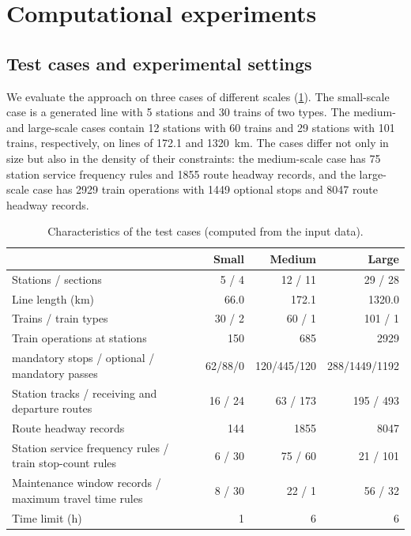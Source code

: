 \section{Computational experiments}\label{sec:exp}
\subsection{Test cases and experimental settings}\label{sec:cases}
We evaluate the approach on three cases of different scales (\cref{tab:cases}). The small-scale case is a generated line with 5 stations and 30 trains of two types. The medium- and large-scale cases contain 12 stations with 60 trains and 29 stations with 101 trains, respectively, on lines of 172.1 and 1320~km. The cases differ not only in size but also in the density of their constraints: the medium-scale case has 75 station service frequency rules and 1855 route headway records, and the large-scale case has 2929 train operations with 1449 optional stops and 8047 route headway records.

\begin{table}[tb]
\centering\small
\caption{Characteristics of the test cases (computed from the input data).}\label{tab:cases}
\setlength{\tabcolsep}{4pt}
\begin{tabular}{@{}>{\raggedright\arraybackslash}p{78mm}rrr@{}}\toprule
 & Small & Medium & Large\\\midrule
Stations / sections & 5 / 4 & 12 / 11 & 29 / 28\\
Line length (km) & 66.0 & 172.1 & 1320.0\\
Trains / train types & 30 / 2 & 60 / 1 & 101 / 1\\
Train operations at stations & 150 & 685 & 2929\\
\quad mandatory stops / optional / mandatory passes & 62/88/0 & 120/445/120 & 288/1449/1192\\
Station tracks / receiving and departure routes & 16 / 24 & 63 / 173 & 195 / 493\\
Route headway records & 144 & 1855 & 8047\\
Station service frequency rules / train stop-count rules & 6 / 30 & 75 / 60 & 21 / 101\\
Maintenance window records / maximum travel time rules & 8 / 30 & 22 / 1 & 56 / 32\\
Time limit (h) & 1 & 6 & 6\\\bottomrule
\end{tabular}
\end{table}

